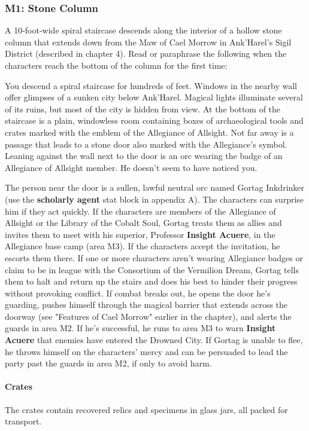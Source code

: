 \documentclass[10pt,a4,twoside,twocolumn,openany,nodeprecatedcode]{dndbook}
\begin{document}
\subsubsection{M1: Stone Column}
A 10-foot-wide spiral staircase descends along the interior of a hollow stone column that extends down from the Maw of Cael Morrow in Ank'Harel's Sigil District (described in chapter 4).
Read or paraphrase the following when the characters reach the bottom of the column for the first time:
\begin{DndReadAloud}{}
You descend a spiral staircase for hundreds of feet. Windows in the nearby wall offer glimpses of a sunken city below Ank'Harel. Magical lights illuminate several of its ruins, but most of the city is hidden from view.
At the bottom of the staircase is a plain, windowless room containing boxes of archaeological tools and crates marked with the emblem of the Allegiance of Allsight. Not far away is a passage that leads to a stone door also marked with the Allegiance's symbol. Leaning against the wall next to the door is an orc wearing the badge of an Allegiance of Allsight member. He doesn't seem to have noticed you.
\end{DndReadAloud}

The person near the door is a sullen, lawful neutral orc named Gortag Inkdrinker (use the \textbf{scholarly agent} stat block in appendix A). The characters can surprise him if they act quickly. If the characters are members of the Allegiance of Allsight or the Library of the Cobalt Soul, Gortag treats them as allies and invites them to meet with his superior, Professor \textbf{Insight Acuere}, in the Allegiance base camp (area M3). If the characters accept the invitation, he escorts them there.
If one or more characters aren't wearing Allegiance badges or claim to be in league with the Consortium of the Vermilion Dream, Gortag tells them to halt and return up the stairs and does his best to hinder their progress without provoking conflict. If combat breaks out, he opens the door he's guarding, pushes himself through the magical barrier that extends across the doorway (see "Features of Cael Morrow" earlier in the chapter), and alerts the guards in area M2. If he's successful, he runs to area M3 to warn \textbf{Insight Acuere} that enemies have entered the Drowned City. If Gortag is unable to flee, he throws himself on the characters' mercy and can be persuaded to lead the party past the guards in area M2, if only to avoid harm.
\paragraph{Crates}
The crates contain recovered relics and specimens in glass jars, all packed for transport.
\end{document}
